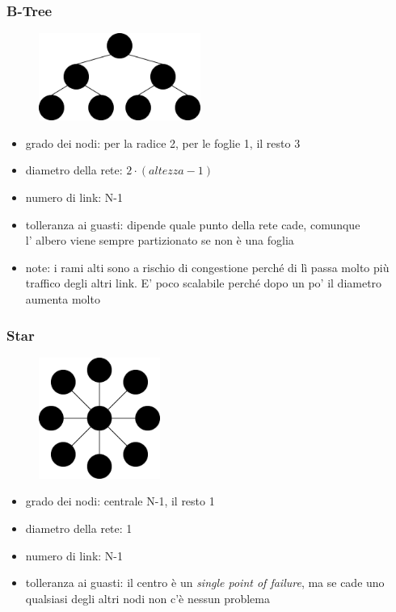 \subsubsection{B-Tree}
\begin{figure}[H]
    \centering
    \includegraphics[width=200px]{images/2_Tassonomia_di_Flynn/B_Tree-topology.png}
\end{figure}

\begin{itemize}
    \item grado dei nodi: per la radice 2, per le foglie 1, il resto 3
    \item diametro della rete: $2 \cdot (altezza - 1)$
    \item numero di link: N-1
    \item tolleranza ai guasti: dipende quale punto della rete cade, comunque \\ l' albero viene sempre partizionato se non è una foglia
    \item note: i rami alti sono a rischio di congestione perché di lì passa molto più traffico degli altri link. E' poco scalabile perché dopo un po' il diametro aumenta molto
\end{itemize}

\subsubsection{Star}
\begin{figure}[H]
    \centering
    \includegraphics[width=150px]{images/2_Tassonomia_di_Flynn/star-topology.png}
\end{figure}

\begin{itemize}
    \item grado dei nodi: centrale N-1, il resto 1
    \item diametro della rete: 1
    \item numero di link: N-1
    \item tolleranza ai guasti: il centro è un \emph{single point of failure}, ma se cade uno qualsiasi degli altri nodi non c'è nessun problema
\end{itemize}


